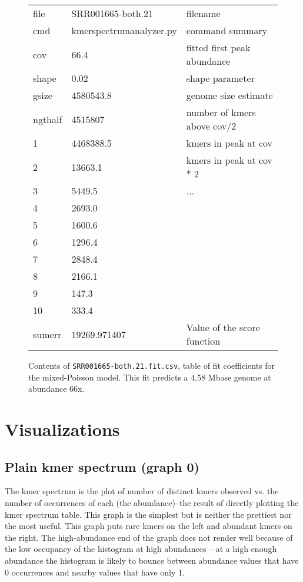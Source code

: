 \documentclass[11pt,fullpage]{article}
\begin{document}
\begin{figure}
\begin{tabular}{lll}
\hline
file &     SRR001665-both.21 & filename \\
cmd   &  kmerspectrumanalyzer.py &  command summary\\ 
cov   &  66.4                   & fitted first peak abundance \\
shape &  0.02                   & shape parameter \\
gsize &  4580543.8              & genome size  estimate \\
ngthalf & 4515807               & number of kmers above cov/2 \\ 
1     &  4468388.5              & kmers in peak at cov \\
2     &  13663.1                & kmers in peak at cov * 2 \\
3     &  5449.5                 & ... \\
4     &  2693.0 &  \\
5     &  1600.6 &  \\
6     &  1296.4 &  \\
7     &  2848.4 &  \\
8     &  2166.1 &  \\
9     &  147.3  &  \\
10    &  333.4  &  \\
sumerr & 19269.971407 & Value of the score function \\
\hline
\end{tabular}
\caption{Contents of \texttt{SRR001665-both.21.fit.csv}, table of fit coefficients for the mixed-Poisson model.  
This fit predicts a 4.58 Mbase genome at abundance 66x.}
\end{figure}

\section{Visualizations}
\subsection{Plain kmer spectrum (graph 0)}
The kmer spectrum is the plot of number of distinct kmers observed vs. the number of 
occurrences of each (the abundance)--the result of directly plotting the kmer
spectrum table.  This graph is the simplest but is neither the 
prettiest nor the most useful.  This graph puts rare kmers on the left and
abundant kmers on the right.  The high-abundance end of the graph does not render well
because of the low occupancy of the histogram at high abundances -- at a high enough
abundance the histogram is likely to bounce between abundance values that have 0 
occurrences and nearby values that have only 1. 
\end{document}
